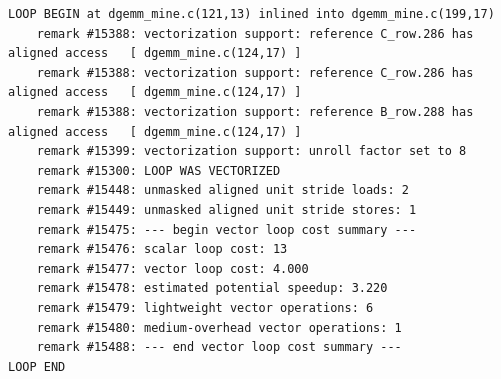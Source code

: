 \documentclass[11pt]{article}
\begin{document}
            \begin{lstlisting}
LOOP BEGIN at dgemm_mine.c(121,13) inlined into dgemm_mine.c(199,17)
    remark #15388: vectorization support: reference C_row.286 has aligned access   [ dgemm_mine.c(124,17) ]
    remark #15388: vectorization support: reference C_row.286 has aligned access   [ dgemm_mine.c(124,17) ]
    remark #15388: vectorization support: reference B_row.288 has aligned access   [ dgemm_mine.c(124,17) ]
    remark #15399: vectorization support: unroll factor set to 8
    remark #15300: LOOP WAS VECTORIZED
    remark #15448: unmasked aligned unit stride loads: 2 
    remark #15449: unmasked aligned unit stride stores: 1 
    remark #15475: --- begin vector loop cost summary ---
    remark #15476: scalar loop cost: 13 
    remark #15477: vector loop cost: 4.000 
    remark #15478: estimated potential speedup: 3.220 
    remark #15479: lightweight vector operations: 6 
    remark #15480: medium-overhead vector operations: 1 
    remark #15488: --- end vector loop cost summary ---
LOOP END
            \end{lstlisting}
\end{document}
